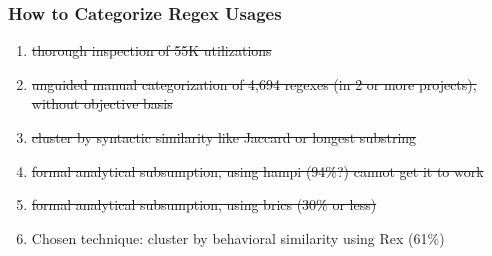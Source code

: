 


\begin{frame}
\frametitle{How to Categorize Regex Usages}
\begin{enumerate}
\item \sout{thorough inspection of 55K utilizations}
\item \sout{unguided manual categorization of 4,694 regexes (in 2 or more projects), without objective basis}
\item \sout{cluster by syntactic similarity like Jaccard or longest substring}
\item \sout{formal analytical subsumption, using hampi (94\%?) cannot get it to work}
\item \sout{formal analytical subsumption, using brics (30\% or less)}
\item \begin{Large}Chosen technique: cluster by behavioral similarity using Rex (61\%)\end{Large}
\end{enumerate}
\end{frame}


